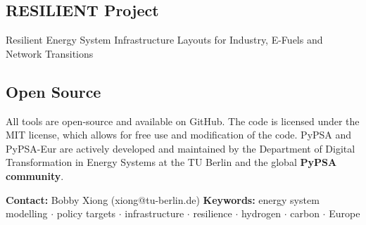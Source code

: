 \documentclass[a0,portrait]{a0poster}
\begin{document}
\begin{multicols}{3}
\noindent

\vspace{2em}
\begin{tcolorbox}[width=0.95\linewidth,colback={about},frame empty,boxsep=1cm]
\section*{RESILIENT Project}
    Resilient Energy System Infrastructure Layouts for Industry, E-Fuels and Network Transitions 
\end{tcolorbox}   

\vspace{2em}
\begin{tcolorbox}[width=0.95\linewidth,colback={conclusion},frame empty,boxsep=1cm]
\section*{Open Source}
    All tools are open-source and available on GitHub. The code is licensed under the MIT
    license, which allows for free use and modification of the code. 
    PyPSA and PyPSA-Eur are actively developed and maintained by the Department of Digital
    Transformation in Energy Systems at the TU Berlin and the global \textbf{PyPSA community}.
\end{tcolorbox}    


\singlespacing
\small


\end{multicols}

\vfill %
\begin{center}
  \colorbox{red100}{\parbox{1\linewidth}{
    \centering
    \color{white}
    \textbf{Contact:} Bobby Xiong (xiong@tu-berlin.de) \quad
    \textbf{Keywords:} \quad energy system modelling $\cdot$ policy targets $\cdot$ infrastructure $\cdot$ resilience $\cdot$ hydrogen $\cdot$ carbon $\cdot$ Europe 
  }}
\end{center}
\end{document}
